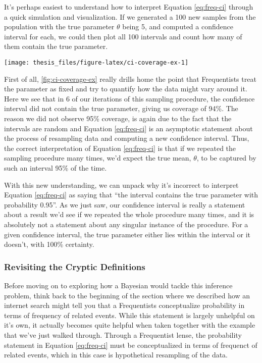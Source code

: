 \documentclass[12pt,twoside]{reedthesis}
\begin{document}
It's perhaps easiest to understand how to interpret Equation \eqref{eq:freq-ci} through a quick simulation and visualization. If we generated a 100 new samples from the population with the true parameter \(\theta\) being 5, and computed a confidence interval for each, we could then plot all 100 intervals and count how many of them contain the true parameter.
\begin{center}\texttt{[image: thesis\_files/figure-latex/ci-coverage-ex-1]} \end{center}

First of all, \ref{fig:ci-coverage-ex} really drills home the point that Frequentists treat the parameter as fixed and try to quantify how the data might vary around it. Here we see that in 6 of our iterations of this sampling procedure, the confidence interval did not contain the true parameter, giving us coverage of 94\%. The reason we did not observe 95\% coverage, is again due to the fact that the intervals are random and Equation \eqref{eq:freq-ci} is an asymptotic statement about the process of resampling data and computing a new confidence interval. Thus, the correct interpretation of Equation \eqref{eq:freq-ci} is that if we repeated the sampling procedure many times, we'd expect the true mean, \(\theta\), to be captured by such an interval 95\% of the time.

With this new understanding, we can unpack why it's incorrect to interpret Equation \eqref{eq:freq-ci} as saying that ``the interval contains the true parameter with probability 0.95''. As we just saw, our confidence interval is really a statement about a result we'd see if we repeated the whole procedure many times, and it is absolutely not a statement about any singular instance of the procedure. For a given confidence interval, the true parameter either lies within the interval or it doesn't, with 100\% certainty.

\hypertarget{revisiting-the-cryptic-definitions}{%
\subsubsection{Revisiting the Cryptic Definitions}\label{revisiting-the-cryptic-definitions}}

Before moving on to exploring how a Bayesian would tackle this inference problem, think back to the beginning of the section where we described how an internet search might tell you that a Frequentists conceptualize probability in terms of frequency of related events. While this statement is largely unhelpful on it's own, it actually becomes quite helpful when taken together with the example that we've just walked through. Through a Frequentist lense, the probability statement in Equation \eqref{eq:freq-ci} must be conceptualized in terms of frequenct of related events, which in this case is hypothetical resampling of the data.
\end{document}

